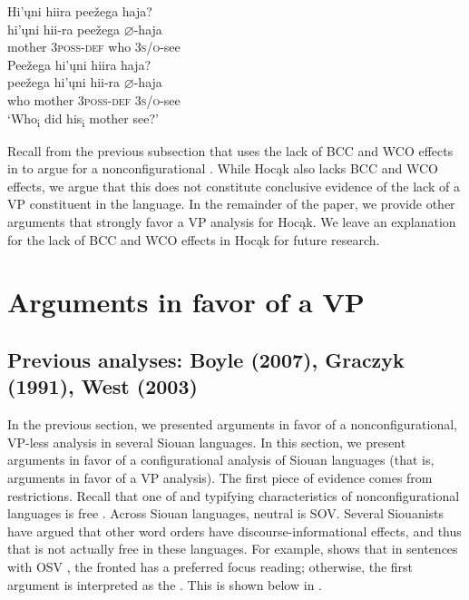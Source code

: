 \documentclass[output=paper]{LSP/langsci}
\begin{document}
\begin{exe}
\ex\label{ex:jrs:21}
\begin{xlist} 	
\ex
\glll Hi'\k{u}ni		hiira					pee\v{z}ega		haja? \\
hi'\k{u}ni		hii-ra 			pee\v{z}ega		$\varnothing$-haja \\
	mother		3\textsc{poss-def}		who	\textsc{3s/o}-see \\ 
    
\ex
\glll Pee\v{z}ega 	hi'\k{u}ni 		hiira		haja?\\
pee\v{z}ega 	hi'\k{u}ni 		hii-ra 		$\varnothing$-haja \\
	who 	mother 	3\textsc{poss-def} 	\textsc{3s/o}-see \\
\trans `Who\textsubscript{i} did his\textsubscript{i} mother see?'
\end{xlist}
\end{exe}

 
Recall from the previous subsection that \citet{VanValin1985,VanValin1987} uses the lack of BCC and WCO effects in  to argue for a nonconfigurational . While Hocąk also lacks BCC and WCO effects, we argue that this does not constitute conclusive evidence of the lack of a VP constituent in the language. In the remainder of the paper, we provide other arguments that strongly favor a VP analysis for Hocąk. We leave an explanation for the lack of BCC and WCO effects in Hocąk for future research.
 
\section{Arguments in favor of a VP}\label{sec:jrs:3}

\subsection{Previous analyses: Boyle (2007), Graczyk (1991), West (2003)}

In the previous section, we presented arguments in favor of a nonconfigurational, VP-less analysis in several Siouan languages.  In this section, we present arguments in favor of a configurational analysis of Siouan languages (that is, arguments in favor of a VP analysis).  The first piece of evidence comes from  restrictions. Recall that one of  and  typifying characteristics of nonconfigurational languages is free .  Across Siouan languages, neutral  is SOV.  Several Siouanists have argued that other word orders have discourse-informational effects, and thus that  is not actually free in these languages. For example, \citet{West2003} shows that in  sentences with OSV , the fronted  has a preferred focus reading; otherwise, the first argument is interpreted as the . This is shown below in . 
\end{document}
